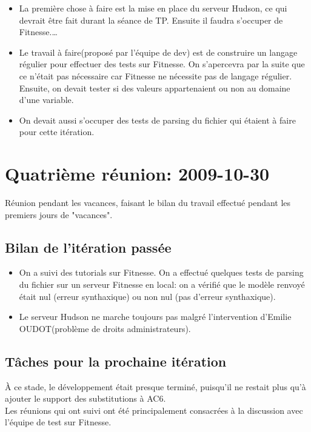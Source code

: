 \documentclass[a4paper,12pt]{article}
\begin{document}
\begin{itemize}

\item La première chose à faire est la mise en place du serveur Hudson, ce qui devrait être
fait durant la séance de TP.
Ensuite il faudra s'occuper de Fitnesse.\dots

\item Le travail à faire(proposé par l'équipe de dev) est de construire un langage régulier pour effectuer des tests sur Fitnesse.
On s'apercevra par la suite que ce n'était pas nécessaire car Fitnesse ne nécessite pas de langage régulier.
Ensuite, on devait tester si des valeurs appartenaient ou non au domaine d'une variable.

\item On devait aussi s'occuper des tests de parsing du fichier qui étaient à faire pour cette itération.

\end{itemize}

\section{Quatrième réunion: 2009-10-30}

Réunion pendant les vacances, faisant le bilan du travail
effectué pendant les premiers jours de "vacances".

\subsection{Bilan de l'itération passée}

\begin{itemize}
 \item On a suivi des tutorials sur Fitnesse. On a effectué quelques tests de parsing du fichier sur un serveur Fitnesse en local:
 on a vérifié que le modèle renvoyé était nul (erreur synthaxique) ou non nul (pas d'erreur synthaxique).
 \item Le serveur Hudson ne marche toujours pas malgré l'intervention d'Emilie OUDOT(problème de droits administrateurs).
\end{itemize}


\subsection{Tâches pour la prochaine itération}

\`A ce stade, le développement était presque terminé, puisqu'il
 ne restait plus qu'à ajouter le support des substitutions à AC6.\mk\\
%
Les réunions qui ont suivi ont été principalement consacrées à
la discussion avec l'équipe de test sur Fitnesse.
\end{document}
